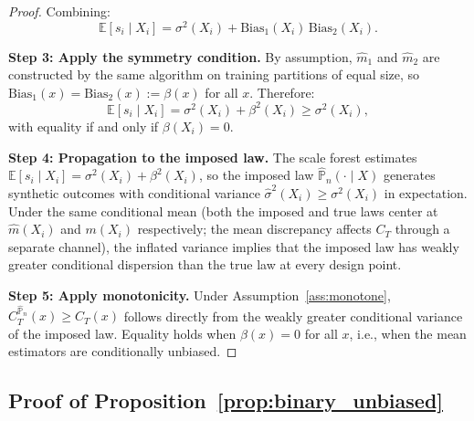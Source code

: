 \documentclass[11pt]{article}
\theoremstyle{plain}
\theoremstyle{definition}
\theoremstyle{remark}
\begin{document}
\begin{proof}
Combining:
\[
\mathbb E[s_i \mid X_i] = \sigma^2(X_i) + \mathrm{Bias}_1(X_i)\,\mathrm{Bias}_2(X_i).
\]

\medskip
\noindent\textbf{Step 3: Apply the symmetry condition.}
By assumption, $\hat m_1$ and $\hat m_2$ are constructed by the same algorithm on training partitions of equal size, so $\mathrm{Bias}_1(x) = \mathrm{Bias}_2(x) := \beta(x)$ for all $x$. Therefore:
\[
\mathbb E[s_i \mid X_i] = \sigma^2(X_i) + \beta^2(X_i) \geq \sigma^2(X_i),
\]
with equality if and only if $\beta(X_i) = 0$.

\medskip
\noindent\textbf{Step 4: Propagation to the imposed law.}
The scale forest estimates $\mathbb E[s_i \mid X_i] = \sigma^2(X_i) + \beta^2(X_i)$, so the imposed law $\widehat{\mathbb P}_n(\cdot \mid X)$ generates synthetic outcomes with conditional variance $\hat\sigma^2(X_i) \geq \sigma^2(X_i)$ in expectation. Under the same conditional mean (both the imposed and true laws center at $\hat m(X_i)$ and $m(X_i)$ respectively; the mean discrepancy affects $C_T$ through a separate channel), the inflated variance implies that the imposed law has weakly greater conditional dispersion than the true law at every design point.

\medskip
\noindent\textbf{Step 5: Apply monotonicity.}
Under Assumption~\ref{ass:monotone}, $C_T^{\widehat{\mathbb P}_n}(x) \geq C_T(x)$ follows directly from the weakly greater conditional variance of the imposed law. Equality holds when $\beta(x) = 0$ for all $x$, i.e., when the mean estimators are conditionally unbiased.
\end{proof}


\subsection{Proof of Proposition~\ref{prop:binary_unbiased}}
\label{app:binary_unbiased}
\end{document}
